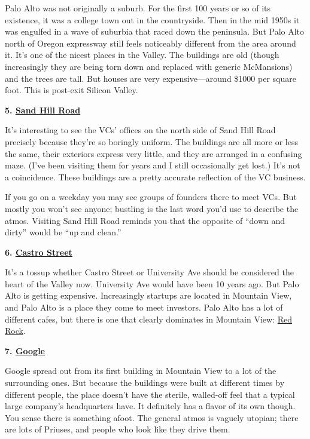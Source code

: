 Palo Alto was not originally a suburb. For the first 100 years or so of
its existence, it was a college town out in the countryside. Then in the
mid 1950s it was engulfed in a wave of suburbia that raced down the
peninsula. But Palo Alto north of Oregon expressway still feels
noticeably different from the area around it. It's one of the nicest
places in the Valley. The buildings are old (though increasingly they
are being torn down and replaced with generic McMansions) and the trees
are tall. But houses are very expensive---around \$1000 per square foot.
This is post-exit Silicon Valley.

\textbf{5.
\href{http://maps.google.com/maps?q=2900+sand+hill+road+menlo+park}{Sand
Hill Road}}

It's interesting to see the VCs' offices on the north side of Sand Hill
Road precisely because they're so boringly uniform. The buildings are
all more or less the same, their exteriors express very little, and they
are arranged in a confusing maze. (I've been visiting them for years and
I still occasionally get lost.) It's not a coincidence. These buildings
are a pretty accurate reflection of the VC business.

If you go on a weekday you may see groups of founders there to meet VCs.
But mostly you won't see anyone; bustling is the last word you'd use to
describe the atmos. Visiting Sand Hill Road reminds you that the
opposite of ``down and dirty'' would be ``up and clean.''

\textbf{6.
\href{http://maps.google.com/maps?q=castro+and+villa+mountain+view}{Castro
Street}}

It's a tossup whether Castro Street or University Ave should be
considered the heart of the Valley now. University Ave would have been
10 years ago. But Palo Alto is getting expensive. Increasingly startups
are located in Mountain View, and Palo Alto is a place they come to meet
investors. Palo Alto has a lot of different cafes, but there is one that
clearly dominates in Mountain View:
\href{http://maps.google.com/places/us/ca/mountain-view/castro-st/201/-red-rock-coffee}{Red
Rock}.

\textbf{7.
\href{http://maps.google.com/maps?q=charleston+road+mountain+view}{Google}}

Google spread out from its first building in Mountain View to a lot of
the surrounding ones. But because the buildings were built at different
times by different people, the place doesn't have the sterile,
walled-off feel that a typical large company's headquarters have. It
definitely has a flavor of its own though. You sense there is something
afoot. The general atmos is vaguely utopian; there are lots of Priuses,
and people who look like they drive them.

